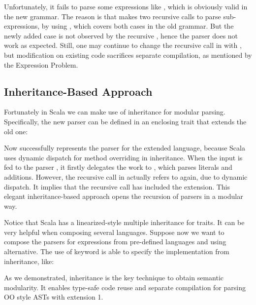 
Unfortunately, it fails to parse some expressions like , which is obviously valid in the new grammar.
The reason is that  makes two recursive calls to parse sub-expressions, by using , which
covers both cases in the old grammar. But the newly added case  is not observed by the recursive ,
hence the parser does not work as expected. Still, one may continue to change the recursive call in  with ,
but modification on existing code sacrifices separate compilation, as mentioned by the Expression Problem.

\subsection{Inheritance-Based Approach}\label{subsec:inheritance-approach}


Fortunately in Scala we can make use of inheritance for modular parsing. Specifically,
the new parser can be defined in an enclosing trait that extends
the old one:

Now  successfully represents the parser for the extended language, because Scala uses dynamic dispatch for
method overriding in inheritance. When the input  is fed to the parser , it firstly delegates
the work to , which parses literals and additions. However, the recursive call  in 
actually refers to  again, due to dynamic dispatch. It implies that the recursive call has included the extension. This
elegant inheritance-based approach opens the recursion of parsers in a modular way.

Notice that Scala has a linearized-style multiple inheritance for traits. It can be very helpful when composing several languages. Suppose now
we want to compose the parsers for expressions from pre-defined languages  and  using alternative.
The use of keyword  is able to
specify the implementation from inheritance, like:


As we demonstrated, inheritance is the key technique to obtain semantic modularity.
It enables type-safe code reuse and separate compilation for parsing OO style ASTs with extension 1.
